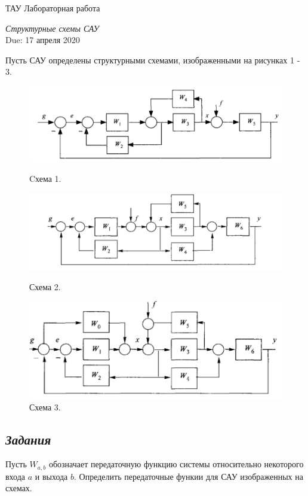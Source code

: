 \documentclass[a4paper,oneside,10pt]{book}
\theoremstyle{definition}
\begin{document}
\begin{center}
{\large  ТАУ \hspace{0.1cm} Лабораторная работа }

\vspace{5pt}
\textit{\large Структурные схемы САУ}\\ %
\vspace{10pt}
Due: 17 апреля 2020 %
\end{center}

\vspace{0.2 cm}



Пусть САУ определены структурными схемами, изображенными на рисунках 1 - 3.


\begin{figure}[h]
\centering
\includegraphics[width=0.7\linewidth]{1.PNG}
\caption{Cхема 1.} \label{Fig:ForkJoinExample}

\includegraphics[width=0.7\linewidth]{2.PNG}
\caption{Схема 2.} \label{Fig:ForkJoinExample}

\includegraphics[width=0.6\linewidth]{3.PNG}
\caption{Схема 3.} \label{Fig:ForkJoinExample}
\end{figure}

\subsection*{\textit{Задания}}
Пусть $W_{a, b}$ обозначает передаточную функцию системы  относительно некоторого входа $a$ и выхода $b$. 
Определить передаточные функии для САУ изображенных на схемах. 
\end{document}
